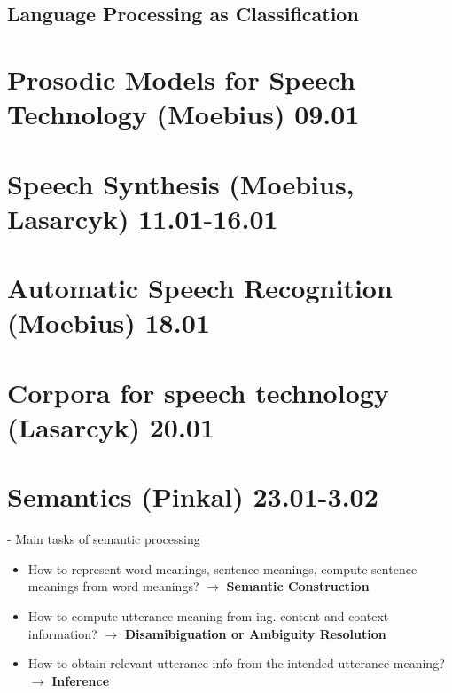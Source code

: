 \documentclass[11pt]{article}
\newenvironment{itemise}{
\begin{itemize}
  \setlength{\itemsep}{1pt}
  \setlength{\parskip}{0pt}
  \setlength{\parsep}{0pt}
}{\end{itemize}}
\begin{document}
\subsection{Language Processing as Classification}


\newpage\section{Prosodic Models for Speech Technology (Moebius) 09.01}

\newpage\section{Speech Synthesis (Moebius, Lasarcyk) 11.01-16.01}

\newpage\section{Automatic Speech Recognition (Moebius) 18.01}

\newpage\section{Corpora for speech technology (Lasarcyk) 20.01}

\newpage\section{Semantics (Pinkal) 23.01-3.02}

- Main tasks of semantic processing
\begin{itemise}
 \item How to represent word meanings, sentence meanings, compute sentence meanings from word meanings? $\rightarrow$ {\bf Semantic Construction}
 \item How to compute utterance meaning from ing. content and context information? $\rightarrow$ {\bf Disamibiguation or Ambiguity Resolution}
 \item How to obtain relevant utterance info from the intended utterance meaning? $\rightarrow$ {\bf Inference}
\end{itemise}
\end{document}
